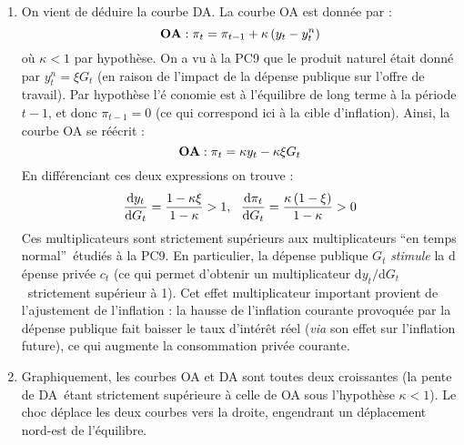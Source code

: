 \documentclass[11pt,a4paper]{article}
\begin{document}
\begin{enumerate}
\item On vient de d\'{e}duire la courbe DA. La courbe OA est donn\'{e}e par :%
\begin{equation*}
\text{\textbf{OA}}:\pi _{t}=\pi _{t-1}+\kappa \left( y_{t}-y_{t}^{n}\right)
\end{equation*}%
o\`{u} $\kappa <1$ par hypoth\`{e}se. On a vu \`{a} la PC9 que le produit
naturel \'{e}tait donn\'{e} par $y_{t}^{n}=\xi G_{t}$ (en raison de l'impact
de la d\'{e}pense publique sur l'offre de travail). Par hypoth\`{e}se l'\'{e}%
conomie est \`{a} l'\'{e}quilibre de long terme \`{a} la p\'{e}riode $t-1$,
et donc $\pi _{t-1}=0$ (ce qui correspond ici \`{a} la cible d'inflation).
Ainsi, la courbe OA se r\'{e}\'{e}crit :%
\begin{equation*}
\text{\textbf{OA}}:\pi _{t}=\kappa y_{t}-\kappa \xi G_{t}
\end{equation*}%
En diff\'{e}renciant ces deux expressions on trouve :%
\begin{equation*}
\frac{\text{d}y_{t}}{\text{d}G_{t}}=\frac{1-\kappa \xi }{1-\kappa }>1,\ \ 
\frac{\text{d}\pi _{t}}{\text{d}G_{t}}=\frac{\kappa \left( 1-\xi \right) }{%
1-\kappa }>0
\end{equation*}%
Ces multiplicateurs sont strictement sup\'{e}rieurs aux multiplicateurs
\textquotedblleft en temps normal\textquotedblright\ \'{e}tudi\'{e}s \`{a}
la PC9. En particulier, la d\'{e}pense publique $G_{t}$ \textit{stimule} la d%
\'{e}pense priv\'{e}e $c_{t}$ (ce qui permet d'obtenir un multiplicateur d$%
y_{t}/$d$G_{t}$\ strictement sup\'{e}rieur \`{a} 1). Cet effet
multiplicateur important provient de l'ajustement de l'inflation : la hausse
de l'inflation courante provoqu\'{e}e par la d\'{e}pense publique fait
baisser le taux d'int\'{e}r\^{e}t r\'{e}el (\textit{via} son effet sur
l'inflation future), ce qui augmente la consommation priv\'{e}e courante.

\item Graphiquement, les courbes OA et DA sont toutes deux croissantes (la
pente de DA\ \'{e}tant strictement sup\'{e}rieure \`{a} celle de OA sous
l'hypoth\`{e}se $\kappa <1$). Le choc d\'{e}place les deux courbes vers la
droite, engendrant un d\'{e}placement nord-est de l'\'{e}quilibre.\newline
{}


\end{enumerate}
\end{document}
